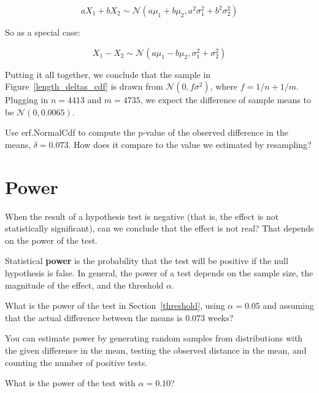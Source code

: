 \documentclass[12pt]{book}
\begin{document}
\[ aX_1 + bX_2 \sim \mathcal{N} (a\mu_1 + b\mu_2, 
                                 a^2\sigma_1^2 + b^2\sigma_2^2) \]

So as a special case:

\[ X_1 - X_2 \sim \mathcal{N} (a\mu_1 - b\mu_2, 
                               \sigma_1^2 + \sigma_2^2) \]

Putting it all together, we conclude that the sample in
Figure~\ref{length_deltas_cdf} is drawn from 
$\mathcal{N} (0, f \sigma^2)$, where $f = 1/n + 1/m$.  Plugging in
$n=4413$ and $m=4735$, we expect the difference of sample means to be
$\mathcal{N} (0, 0.0065)$.

\begin{ex}

Use erf.NormalCdf to compute the p-value of the observed difference
in the means, $\delta=0.073$.  How does it compare to the value
we estimated by resampling?

\end{ex}



\section{Power}

When the result of a hypothesis test is negative (that is, the effect is
not statistically significant), can we conclude that the effect is not
real?  That depends on the power of the test.

Statistical {\bf power} is the probability that the test will be
positive if the null hypothesis is false.  In general, the power of a
test depends on the sample size, the magnitude of the effect, and the
threshold $\alpha$.

\begin{ex}

What is the power of the test in Section~\ref{threshold}, using
$\alpha=0.05$ and assuming that the actual difference between the
means is $0.073$ weeks?

You can estimate power by generating random samples from distributions
with the given difference in the mean, testing the observed distance
in the mean, and counting the number of positive tests.

What is the power of the test with $\alpha=0.10$?

\end{ex}
\end{document}
